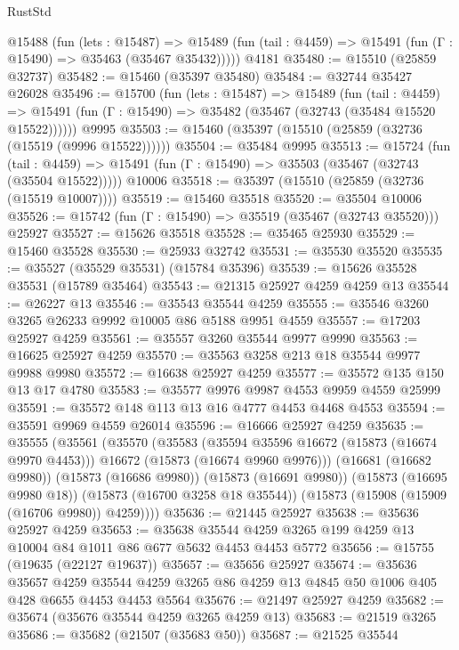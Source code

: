 \begin{lexlean}{RustStd}
\begin{coremodule}
    @15488
      (fun (lets : @15487) =>
      @15489 (fun (tail : @4459) => @15491 (fun (Γ : @15490) => @35463 (@35467 @35432)))))
    @4181
@35480 := @15510 (@25859 @32737)
@35482 := @15460 (@35397 @35480)
@35484 := @32744 @35427 @26028
@35496 := @15700
    (fun (lets : @15487) =>
    @15489
      (fun (tail : @4459) =>
      @15491 (fun (Γ : @15490) => @35482 (@35467 (@32743 (@35484 @15520 @15522))))))
    @9995
@35503 := @15460 (@35397 (@15510 (@25859 (@32736 (@15519 (@9996 @15522))))))
@35504 := @35484 @9995
@35513 := @15724
    (fun (tail : @4459) => @15491 (fun (Γ : @15490) => @35503 (@35467 (@32743 (@35504 @15522)))))
    @10006
@35518 := @35397 (@15510 (@25859 (@32736 (@15519 @10007))))
@35519 := @15460 @35518
@35520 := @35504 @10006
@35526 := @15742 (fun (Γ : @15490) => @35519 (@35467 (@32743 @35520))) @25927
@35527 := @15626 @35518
@35528 := @35465 @25930
@35529 := @15460 @35528
@35530 := @25933 @32742
@35531 := @35530 @35520
@35535 := @35527 (@35529 @35531) (@15784 @35396)
@35539 := @15626 @35528 @35531 (@15789 @35464)
@35543 := @21315 @25927 @4259 @4259 @13
@35544 := @26227 @13
@35546 := @35543 @35544 @4259
@35555 := @35546 @3260 @3265 @26233 @9992 @10005 @86 @5188 @9951 @4559
@35557 := @17203 @25927 @4259
@35561 := @35557 @3260 @35544 @9977 @9990
@35563 := @16625 @25927 @4259
@35570 := @35563 @3258 @213 @18 @35544 @9977 @9988 @9980
@35572 := @16638 @25927 @4259
@35577 := @35572 @135 @150 @13 @17 @4780
@35583 := @35577 @9976 @9987 @4553 @9959 @4559 @25999
@35591 := @35572 @148 @113 @13 @16 @4777 @4453 @4468 @4553
@35594 := @35591 @9969 @4559 @26014
@35596 := @16666 @25927 @4259
@35635 := @35555
    (@35561
      (@35570
        (@35583
          (@35594 @35596 @16672 (@15873 (@16674 @9970 @4453)))
          @16672
          (@15873 (@16674 @9960 @9976)))
        (@16681 (@16682 @9980))
        (@15873 (@16686 @9980))
        (@15873 (@16691 @9980))
        (@15873 (@16695 @9980 @18))
        (@15873 (@16700 @3258 @18 @35544))
        (@15873 (@15908 (@15909 (@16706 @9980)) @4259))))
@35636 := @21445 @25927
@35638 := @35636 @25927 @4259
@35653 := @35638 @35544 @4259 @3265 @199 @4259 @13 @10004 @84 @1011 @86 @677 @5632 @4453 @4453 @5772
@35656 := @15755 (@19635 (@22127 @19637))
@35657 := @35656 @25927
@35674 := @35636
    @35657
    @4259
    @35544
    @4259
    @3265
    @86
    @4259
    @13
    @4845
    @50
    @1006
    @405
    @428
    @6655
    @4453
    @4453
    @5564
@35676 := @21497 @25927 @4259
@35682 := @35674 (@35676 @35544 @4259 @3265 @4259 @13)
@35683 := @21519 @3265
@35686 := @35682 (@21507 (@35683 @50))
@35687 := @21525 @35544

\end{coremodule}
\end{lexlean}
